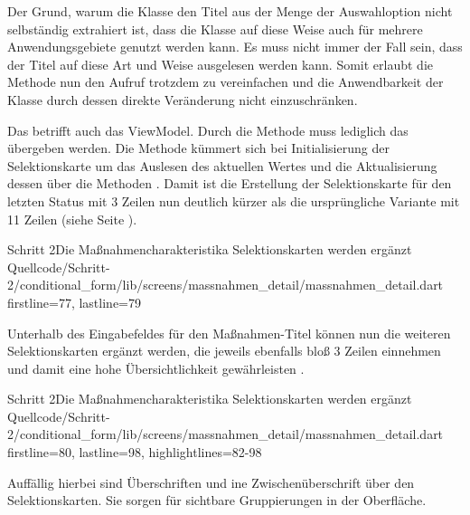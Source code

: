 Der Grund, warum die Klasse  den Titel aus der Menge der Auswahloption nicht selbständig extrahiert ist, dass die Klasse auf diese Weise auch für mehrere Anwendungsgebiete genutzt werden kann.
Es muss nicht immer der Fall sein, dass der Titel auf diese Art und Weise ausgelesen werden kann.
Somit erlaubt die Methode  nun den Aufruf trotzdem zu vereinfachen und die Anwendbarkeit der Klasse  durch dessen direkte Veränderung nicht einzuschränken.

Das betrifft auch das ViewModel. Durch die Methode  muss lediglich das  übergeben werden. Die Methode kümmert sich bei Initialisierung der Selektionskarte um das Auslesen des aktuellen Wertes  und die Aktualisierung dessen über die Methoden     . Damit ist die Erstellung der Selektionskarte für den letzten Status mit 3 Zeilen \Lst{\ref{lst:Schritt2BuildSelectionCardLetzterStatusChoices}} nun deutlich kürzer als die ursprüngliche Variante mit 11 Zeilen (siehe Seite \pageref{lst:Schritt1AusgabeDerFormularfelder}).

\begin{alexlisting}{Schritt 2}{Die Maßnahmencharakteristika Selektionskarten werden ergänzt}
  {Quellcode/Schritt-2/conditional_form/lib/screens/massnahmen_detail/massnahmen_detail.dart}
  {firstline=77, lastline=79}
  \label{lst:Schritt2BuildSelectionCardLetzterStatusChoices}
\end{alexlisting}

Unterhalb des Eingabefeldes für den Maßnahmen-Titel können nun die weiteren Selektionskarten ergänzt werden, die jeweils ebenfalls bloß 3 Zeilen einnehmen und damit eine hohe Übersichtlichkeit gewährleisten .

\begin{alexlisting}{Schritt 2}{Die Maßnahmencharakteristika Selektionskarten werden ergänzt}
  {Quellcode/Schritt-2/conditional_form/lib/screens/massnahmen_detail/massnahmen_detail.dart}
  {firstline=80, lastline=98, highlightlines={82-98}}
  \label{lst:Schritt2MassnahmencharakteristikaSelektionskartenWerdenErgaenzt}
\end{alexlisting}

Auffällig hierbei sind Überschriften  und ine Zwischenüberschrift  über den Selektionskarten. Sie sorgen für sichtbare Gruppierungen in der Oberfläche.

